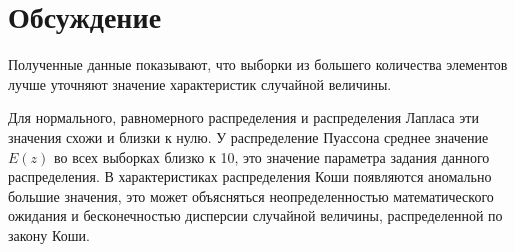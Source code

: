 \documentclass[12pt,a4paper]{article}
\begin{document}
\section{Обсуждение}
Полученные данные показывают, что выборки из большего количества элементов лучше уточняют значение характеристик случайной величины. 

Для нормального, равномерного распределения и распределения Лапласа эти значения схожи и близки к нулю. У распределение Пуассона среднее значение $E(z)$ во всех выборках близко к 10, это значение параметра задания данного распределения. В характеристиках распределения Коши появляются аномально большие значения, это может объясняться неопределенностью математического ожидания и бесконечностью дисперсии случайной величины, распределенной по закону Коши.
\end{document}
